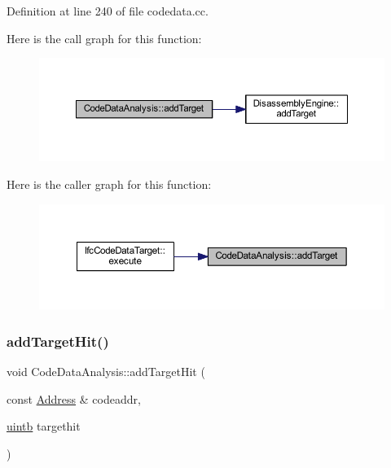 Definition at line 240 of file codedata.\+cc.

Here is the call graph for this function\+:
\nopagebreak
\begin{figure}[H]
\begin{center}
\leavevmode
\includegraphics[width=350pt]{class_code_data_analysis_a67d42a5bdfb0801cb8ae03e4d8c5b021_cgraph}
\end{center}
\end{figure}
Here is the caller graph for this function\+:
\nopagebreak
\begin{figure}[H]
\begin{center}
\leavevmode
\includegraphics[width=350pt]{class_code_data_analysis_a67d42a5bdfb0801cb8ae03e4d8c5b021_icgraph}
\end{center}
\end{figure}
\mbox{\label{class_code_data_analysis_aa393f0d01fea19b3249d4a282bd17b52}} 
\subsubsection{\texorpdfstring{addTargetHit()}{addTargetHit()}}
{\footnotesize\ttfamily void Code\+Data\+Analysis\+::add\+Target\+Hit (\begin{DoxyParamCaption}\item[{const \mbox{\hyperlink{class_address}{Address}} \&}]{codeaddr,  }\item[{\mbox{\hyperlink{types_8h_a2db313c5d32a12b01d26ac9b3bca178f}{uintb}}}]{targethit }\end{DoxyParamCaption})}



